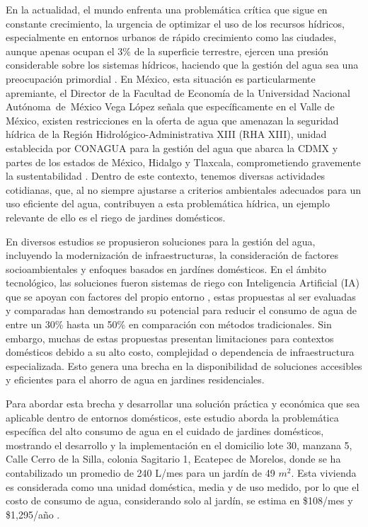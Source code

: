 \documentclass[pdflatex,sn-mathphys-num]{sn-jnl}%
\theoremstyle{thmstyleone}%
\theoremstyle{thmstyletwo}%
\theoremstyle{thmstylethree}%
\begin{document}
\begin{multicols}{2}
\justifying
En la actualidad, el mundo enfrenta una problemática crítica que sigue en constante crecimiento, la urgencia de optimizar el uso de los recursos hídricos, especialmente en entornos urbanos de rápido crecimiento como las ciudades, aunque apenas ocupan el 3\% de la superficie terrestre, ejercen una presión considerable sobre los sistemas hídricos, haciendo que la gestión del agua sea una preocupación primordial \cite{ref1}. En México, esta situación es particularmente apremiante, el Director de la Facultad de Economía de la Universidad Nacional Autónoma de México Vega López señala que específicamente en el Valle de México, existen restricciones en la oferta de agua que amenazan la seguridad hídrica de la Región Hidrológico-Administrativa XIII (RHA XIII), unidad establecida por CONAGUA para la gestión del agua que abarca la CDMX y partes de los estados de México, Hidalgo y Tlaxcala, comprometiendo gravemente la sustentabilidad \cite{ref2}. Dentro de este contexto, tenemos diversas actividades cotidianas, que, al no siempre ajustarse a criterios ambientales adecuados para un uso eficiente del agua, contribuyen a esta problemática hídrica, un ejemplo relevante de ello es el riego de jardines domésticos.

En diversos estudios se propusieron soluciones para la gestión del agua, incluyendo la modernización de infraestructuras, la consideración de factores socioambientales y enfoques basados en jardínes domésticos. En el ámbito tecnológico, las soluciones fueron sistemas de riego con Inteligencia Artificial (IA) que se apoyan con factores del propio entorno \cite{ref3}, estas propuestas al ser evaluadas y comparadas han demostrando su potencial para reducir el consumo de agua de entre un 30\% hasta un 50\% en comparación con métodos tradicionales. Sin embargo, muchas de estas propuestas presentan limitaciones para contextos domésticos debido a su alto costo, complejidad o dependencia de infraestructura especializada. Esto genera una brecha en la disponibilidad de soluciones accesibles y eficientes para el ahorro de agua en jardines residenciales.

Para abordar esta brecha y desarrollar una solución práctica y económica que sea aplicable dentro de entornos domésticos, este estudio aborda la problemática específica del alto consumo de agua en el cuidado de jardines domésticos, mostrando el desarrollo y la implementación en el domicilio lote 30, manzana 5, Calle Cerro de la Silla, colonia Sagitario 1, Ecatepec de Morelos, donde se ha contabilizado un promedio de 240 L/mes para un jardín de 49 $m^2$. Esta vivienda es considerada como una unidad doméstica, media y de uso medido, por lo que el costo de consumo de agua, considerando solo al jardín, se estima en \$108/mes y \$1,295/año \cite{ref4}.


\end{multicols}
\end{document}
